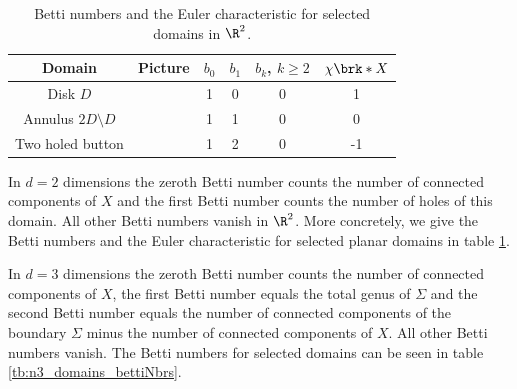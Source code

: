 \begin{table}[h]
  \centering
  \renewcommand{\arraystretch}{3}
  \begin{tabular}{c|c|c|c|c|c}
    Domain & Picture & $b_0$ & $b_1$ & $b_k$, $k\geq2$ & $\chi\brk*{X}$ \\ \hline
    Disk $D$ & 
    \begin{minipage}{0.1\textwidth}
      \def\svgwidth{\textwidth}
      
    \end{minipage}
    & 1 & 0 & 0 & 1 \\
    Annulus $2D\setminus D$ & 
    \begin{minipage}{0.1\textwidth}
      \def\svgwidth{\textwidth}
      
    \end{minipage}
    & 1 & 1 & 0 & 0 \\
    Two holed button & 
    \begin{minipage}{0.1\textwidth}
      \def\svgwidth{\textwidth}
      
    \end{minipage}
    & 1 & 2 & 0 & -1\\
  \end{tabular}
  \caption{Betti numbers and the Euler characteristic for selected domains in $\R^2$.}
  \label{tb:n2_domains_bettiNbrs}
\end{table}
\begin{example}[In flatland]
  In $d=2$ dimensions the zeroth Betti number counts the number of connected components
  of $X$ and the first Betti number counts the number of holes of this domain.
  All other Betti numbers vanish in $\R^2$.
  More concretely, we give the Betti numbers and the Euler characteristic for selected planar domains in table \ref{tb:n2_domains_bettiNbrs}.
\end{example}
%
\begin{example}
  In $d=3$ dimensions the zeroth Betti number counts the number of connected components
  of $X$, the first Betti number equals the total genus of $\Sigma$ and the second Betti number
  equals the number of connected components of the boundary $\Sigma$ minus the number of connected components of $X$. All other Betti numbers vanish.
  The Betti numbers for selected domains can be seen in table \ref{tb:n3_domains_bettiNbrs}.
\end{example}
%
